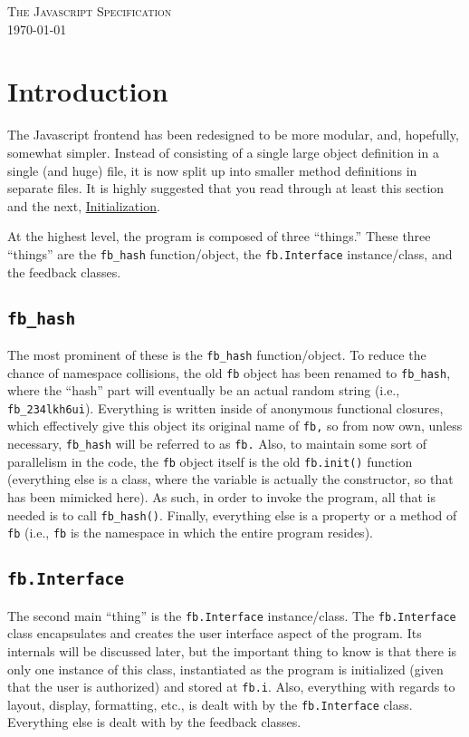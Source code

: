 \documentclass[letterpaper,12pt]{article}
\newcommand{\fb}[1]{\texttt{fb#1}}
\newcommand{\fbhash}[1]{\texttt{fb\_hash#1}}
\newcommand{\printtitle}{\begin{flushright}{\LARGE \scshape The Javascript Specification}\\\today\end{flushright}}
\begin{document}
\pagestyle{headings}
\thispagestyle{plain}
\printtitle

\tableofcontents

\section{Introduction}
\label{sec:intro}
The Javascript frontend has been redesigned to be more modular, and, hopefully, somewhat simpler.  Instead of consisting of a single large object definition in a single (and huge) file, it is now split up into smaller method definitions in separate files.  It is highly suggested that you read through at least this section and the next, \hyperref[sec:init]{Initialization}.

At the highest level, the program is composed of three ``things.''  These three ``things'' are the \fbhash{} function/object, the \fb{.Interface} instance/class, and the feedback classes.

\subsection{\texorpdfstring{\fbhash{}}{fb\_hash}}
\label{sec:intro:fb_hash}
The most prominent of these is the \fbhash{} function/object.  To reduce the chance of namespace collisions, the old \fb{} object has been renamed to \fbhash{}, where the ``hash'' part will eventually be an actual random string (i.e., \fb{\_234lkh6ui}).  Everything is written inside of anonymous functional closures, which effectively give this object its original name of \fb, so from now own, unless necessary, \fbhash{} will be referred to as \fb.  Also, to maintain some sort of parallelism in the code, the \fb{} object itself is the old \fb{.init()} function (everything else is a class, where the variable is actually the constructor, so that has been mimicked here).  As such, in order to invoke the program, all that is needed is to call \fbhash{()}.  Finally, everything else is a property or a method of \fb{} (i.e., \fb{} is the namespace in which the entire program resides).

\subsection{\texorpdfstring{\fb{.Interface}}{fb.Interface}}
\label{sec:intro:fb.Interface}
The second main ``thing'' is the \fb{.Interface} instance/class.  The \fb{.Interface} class encapsulates and creates the user interface aspect of the program.  Its internals will be discussed later, but the important thing to know is that there is only one instance of this class, instantiated as the program is initialized (given that the user is authorized) and stored at \fb{.i}.  Also, everything with regards to layout, display, formatting, etc., is dealt with by the \fb{.Interface} class.  Everything else is dealt with by the feedback classes.
\end{document}
